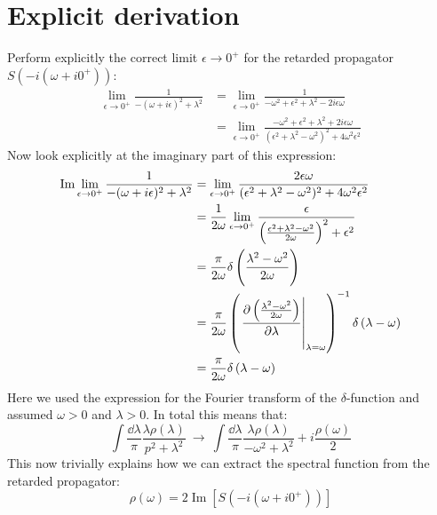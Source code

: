 \documentclass[digital, %
			   openright, %
			   parskip=half,
			   11pt]{mythesis}
\begin{document}
\section*{Explicit derivation}
Perform explicitly the correct limit $\epsilon\rightarrow 0^+$ for the retarded propagator $S(-i(\omega + i0^+))$:
\begin{equation}
	\begin{aligned}
		\lim\limits_{\epsilon\rightarrow 0^+} \frac{1}{-(\omega + i\epsilon)^2 + \lambda^2} &= 	\lim\limits_{\epsilon\rightarrow 0^+} \frac{1}{-\omega^2 + \epsilon^2 + \lambda^2 - 2i\epsilon\omega} \\
		&= 	\lim\limits_{\epsilon\rightarrow 0^+} \frac{-\omega^2 + \epsilon^2 + \lambda^2 + 2i\epsilon\omega}{(\epsilon^2 + \lambda^2 - \omega^2)^2 + 4\omega^2\epsilon^2}
	\end{aligned}
\end{equation}
Now look explicitly at the imaginary part of this expression:
\begin{equation}
	\begin{aligned}
		\Im \lim\limits_{\epsilon\rightarrow 0^+} \frac{1}{-(\omega + i\epsilon)^2 + \lambda^2} &= \lim\limits_{\epsilon\rightarrow 0^+}  \frac{2\epsilon\omega}{(\epsilon^2 + \lambda^2 - \omega^2)^2 + 4\omega^2\epsilon^2} \\
		&= \frac{1}{2\omega}  \lim\limits_{\epsilon\rightarrow 0^+} \frac{\epsilon}{\left(\frac{\epsilon^2 + \lambda^2 - \omega^2}{2\omega}\right)^2 + \epsilon^2}\\
		&= \frac{\pi}{2\omega}\delta\left(\frac{\lambda^2-\omega^2}{2\omega}\right) \\
		&= \frac{\pi}{2\omega}\left(\eval{\frac{\partial\left(\frac{\lambda^2-\omega^2}{2\omega}\right)}{\partial\lambda}}_{\lambda=\omega}\right)^{-1}\delta\left(\lambda-\omega\right)\\
		&= \frac{\pi}{2\omega}\delta\left(\lambda-\omega\right)
	\end{aligned}
\end{equation}
Here we used the expression for the Fourier transform of the $\delta$-function and assumed $\omega > 0$ and $\lambda > 0$. In total this means that:
\begin{equation}
	\int\frac{\dd\lambda}{\pi}\frac{\lambda\rho(\lambda)}{p^2 + \lambda^2}\ \longrightarrow\ \int\frac{\dd\lambda}{\pi}\frac{\lambda\rho(\lambda)}{-\omega^2 + \lambda^2} + i\frac{\rho(\omega)}{2}
\end{equation}
This now trivially explains how we can extract the spectral function from the retarded propagator:
\begin{equation}
	\rho(\omega) =  2 \operatorname{Im}\left[S\left(-i(\omega + i0^+)\right)\right]
\end{equation}
\end{document}
